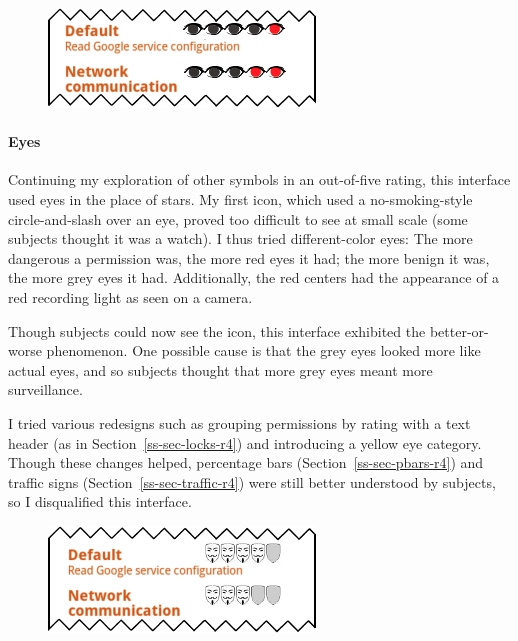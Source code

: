 \documentclass[11pt]{article}
\newcommand{\refsec}[1]{Section~\ref{#1}}
\begin{document}
\begin{figure}
\begin{center}
\includegraphics[width=.9\linewidth]{candidate-img/eyes/eyesR2.png}
\end{center}
\end{figure}

\paragraph{Eyes}
\label{s-sec-eyes}

Continuing my exploration of other symbols in an out-of-five rating, this 
interface used eyes in the place of stars. My first icon, which
used a no-smoking-style circle-and-slash over an eye, 
proved too difficult to see at small scale
(some subjects thought it was a watch). I thus tried different-color eyes:
\label{ss-sec-eyes-r2}
The more dangerous a permission was, the more red eyes it had; the more
benign it was, the more grey eyes it had.
Additionally, the red centers had 
the appearance of a red recording light as seen on a camera.

Though subjects could now see the icon, this interface exhibited 
the better-or-worse phenomenon. One possible cause is that 
the grey eyes looked more like actual eyes, and so subjects thought that more 
grey eyes meant more surveillance. 

I tried various redesigns such as grouping permissions by rating with a
text header (as 
in \refsec{ss-sec-locks-r4}) and introducing a yellow eye category. Though these changes helped, 
percentage bars (\refsec{ss-sec-pbars-r4}) and traffic signs 
(\refsec{ss-sec-traffic-r4}) were still better understood by subjects,
so I disqualified this interface.


\begin{figure}
\begin{center}
\includegraphics[width=.9\linewidth]{candidate-img/masks/masksR1.png}
\end{center}
\end{figure}
\end{document}
